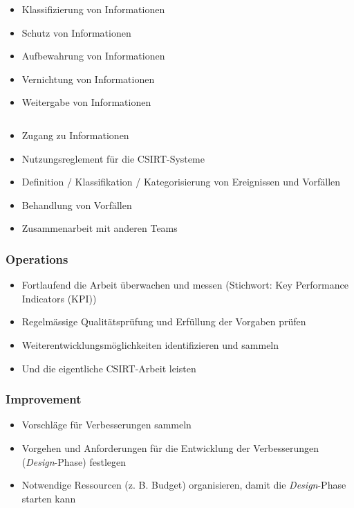\begin{minipage}{0.4\linewidth}
    \begin{itemize}
        \item Klassifizierung von Informationen
        \item Schutz von Informationen
        \item Aufbewahrung von Informationen
        \item Vernichtung von Informationen
        \item Weitergabe von Informationen
    \end{itemize}
    \vfill
    $ $
\end{minipage}
\begin{minipage}{0.6\linewidth}
    \begin{itemize}
        \item Zugang zu Informationen
        \item Nutzungsreglement für die CSIRT-Systeme
        \item Definition / Klassifikation / Kategorisierung von Ereignissen und Vorfällen
        \item Behandlung von Vorfällen
        \item Zusammenarbeit mit anderen Teams
    \end{itemize}
\end{minipage}

\subsubsection{Operations}
\begin{itemize}
    \item Fortlaufend die Arbeit überwachen und messen (Stichwort: Key Performance Indicators (KPI))
    \item Regelmässige Qualitätsprüfung und Erfüllung der Vorgaben prüfen
    \item Weiterentwicklungsmöglichkeiten identifizieren und sammeln
    \item Und die eigentliche CSIRT-Arbeit leisten
\end{itemize}

\subsubsection{Improvement}
\begin{itemize}
    \item Vorschläge für Verbesserungen sammeln
    \item Vorgehen und Anforderungen für die Entwicklung der Verbesserungen (\textit{Design}-Phase) festlegen
    \item Notwendige Ressourcen (z. B. Budget) organisieren, damit die \textit{Design}-Phase starten kann
\end{itemize}

